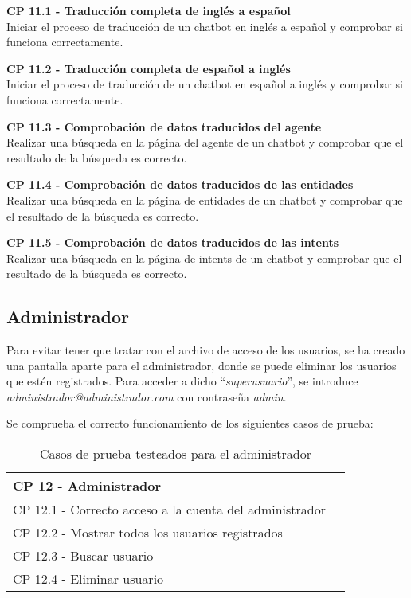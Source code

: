 \textbf{CP 11.1 - Traducción completa de inglés a español} \\
Iniciar el proceso de traducción de un chatbot en inglés a español y comprobar si funciona correctamente.

\textbf{CP 11.2 - Traducción completa de español a inglés} \\
Iniciar el proceso de traducción de un chatbot en español a inglés y comprobar si funciona correctamente.

\textbf{CP 11.3 - Comprobación de datos traducidos del agente} \\
Realizar una búsqueda en la página del agente de un chatbot y comprobar que el resultado de la búsqueda es correcto.

\textbf{CP 11.4 - Comprobación de datos traducidos de las entidades} \\
Realizar una búsqueda en la página de entidades de un chatbot y comprobar que el resultado de la búsqueda es correcto.

\textbf{CP 11.5 - Comprobación de datos traducidos de las intents} \\
Realizar una búsqueda en la página de intents de un chatbot y comprobar que el resultado de la búsqueda es correcto.


\subsection{Administrador}
Para evitar tener que tratar con el archivo de acceso de los usuarios, se ha creado una pantalla aparte para el administrador, donde se puede eliminar los usuarios que estén registrados. Para acceder a dicho ``\textit{superusuario}'', se introduce \textit{administrador@administrador.com} con contraseña \textit{admin}.

Se comprueba el correcto funcionamiento de los siguientes casos de prueba:

\begin{table}[H]
\centering
\begin{tabular}{ll}
\toprule
CP 12 - Administrador   \\
\midrule
CP 12.1 - Correcto acceso a la cuenta del administrador  \\
CP 12.2 - Mostrar todos los usuarios registrados \\
CP 12.3 - Buscar usuario \\
CP 12.4 - Eliminar usuario \\
\bottomrule
\end{tabular}
\caption{Casos de prueba testeados para el administrador}
\end{table}

